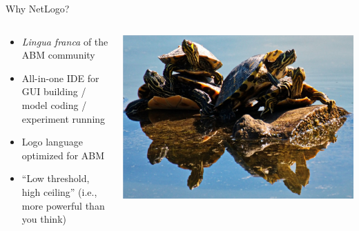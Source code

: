 \documentclass[table, 14pt, aspectratio=169]{beamer}
\begin{document}
\begin{frame}{Why NetLogo?}
  \begin{columns}[T]
    \begin{column}{0.5\textwidth}\small
      \begin{itemize}
        \item \emph{Lingua franca} of the ABM community
        \item All-in-one IDE for GUI building / model coding / experiment running
        \item Logo language optimized for ABM
        \item ``Low threshold, high ceiling'' (i.e., more powerful than you think)
      \end{itemize}
    \end{column}
    \begin{column}{0.5\textwidth}
      \includegraphics[width=\linewidth]{images/turtles.png}
    \end{column}
  \end{columns}
\end{frame}
\end{document}
